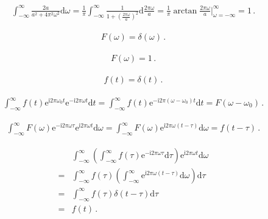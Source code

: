\begin{align}
    \int_{-\infty}^{\infty}\frac{2a}{a^2+4\pi^2\omega^2}\mathrm{d}\omega
    =\frac{1}{\pi}\int_{-\infty}^{\infty}\frac{1}{1+\left(\frac{2\pi\omega}{a}\right)^2}\mathrm{d}\frac{2\pi\omega}{a}
    =\frac{1}{\pi}\arctan\frac{2\pi\omega}{a}\bigg|_{\omega=-\infty}^{\infty}=1\, .
\end{align}

\begin{align}
    F(\omega)=\delta(\omega)\, .
\end{align}

\begin{align}
    F(\omega)=1\, .
\end{align}

\begin{align}
    f(t)=\delta(t)\, .
\end{align}

\begin{align}
    \int_{-\infty}^{\infty}f(t)\mathrm{e}^{\mathrm{i}2\pi\omega_0 t}\mathrm{e}^{-\mathrm{i}2\pi\omega t}\mathrm{d}t
    =\int_{-\infty}^{\infty}f(t)\mathrm{e}^{-\mathrm{i}2\pi(\omega-\omega_0) t}\mathrm{d}t=F(\omega-\omega_0)\, .
\end{align}

\begin{align}
    \int_{-\infty}^{\infty}F(\omega)\mathrm{e}^{-\mathrm{i}2\pi\omega\tau}\mathrm{e}^{\mathrm{i}2\pi\omega t}\mathrm{d}\omega
    =\int_{-\infty}^{\infty}F(\omega)\mathrm{e}^{\mathrm{i}2\pi\omega(t-\tau)}\mathrm{d}\omega
    =f(t-\tau)\, .
\end{align}

\begin{align}
      & \int_{-\infty}^{\infty}\left(\int_{-\infty}^{\infty}f(\tau)\mathrm{e}^{-\mathrm{i}2\pi\omega\tau}\mathrm{d}\tau\right)\mathrm{e}^{\mathrm{i}2\pi\omega t}\mathrm{d}\omega\nonumber \\
    = & \int_{-\infty}^{\infty}f(\tau)\left(\int_{-\infty}^{\infty}\mathrm{e}^{\mathrm{i}2\pi\omega(t-\tau)}\mathrm{d}\omega\right)\mathrm{d}\tau\nonumber                                 \\
    = & \int_{-\infty}^{\infty}f(\tau)\delta(t-\tau)\mathrm{d}\tau\nonumber                                                                                                                \\
    = & f(t)\, .
\end{align}

